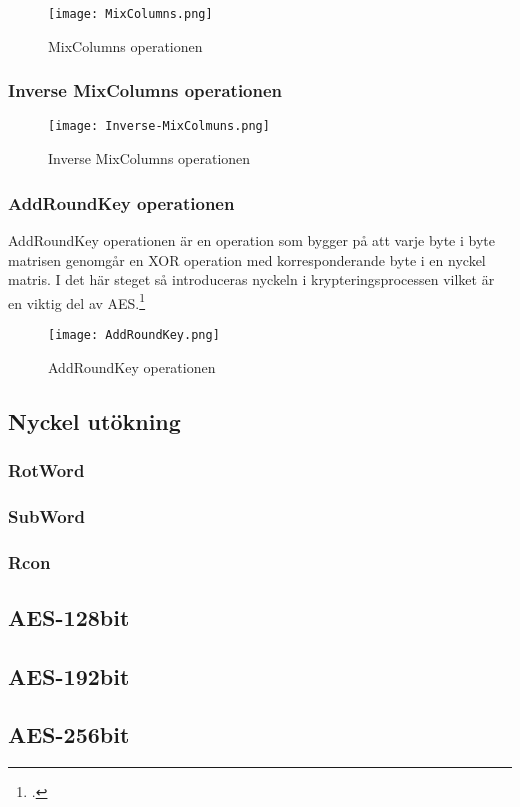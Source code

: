 \begin{figure}[H]
    \centering
    \texttt{[image: MixColumns.png]}
    \caption{MixColumns operationen}
    \label{fig:aes-mixcolumns-pic}
\end{figure}

\subsubsection{Inverse MixColumns operationen}
\label{sec:aes-invers-mixcolumns}

\begin{figure}[H]
    \centering
    \texttt{[image: Inverse-MixColmuns.png]}
    \caption{Inverse MixColumns operationen}
    \label{fig:aes-inverse-mixcolumns-pic}
\end{figure}

\subsubsection{AddRoundKey operationen}
\label{sec:aes-addroundkey}

AddRoundKey operationen är en operation som bygger på att varje \gls{byte} i \gls{byte} matrisen genomgår en XOR operation med korresponderande \gls{byte} i en nyckel matris.
I det här steget så introduceras nyckeln i krypteringsprocessen vilket är en viktig del av AES.\footcite{daemen1999aes}

\begin{figure}[H]
    \centering
    \texttt{[image: AddRoundKey.png]}
    \caption{AddRoundKey operationen}
    \label{fig:aes-addroundkey-pic}
\end{figure}

\subsection{Nyckel utökning}
\label{sec:aes-key-expansion}


\subsubsection{RotWord}
\label{sec:aes-rotword}


\subsubsection{SubWord}
\label{sec:aes-subword}


\subsubsection{Rcon}
\label{sec:aes-rcon}


\subsection{AES-128bit}
\label{sec:aes-128bit}


\subsection{AES-192bit}
\label{sec:aes-192bit}


\subsection{AES-256bit}
\label{sec:aes-256bit}


